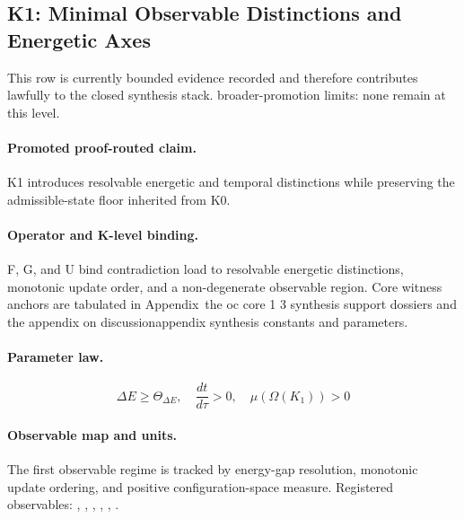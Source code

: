 \subsection{K1: Minimal Observable Distinctions and Energetic Axes}
\label{sec:oc-core-1-3-synthesis-k1}
This row is currently bounded evidence recorded and therefore contributes lawfully to the closed synthesis stack.
broader-promotion limits: none remain at this level.

\paragraph{Promoted proof-routed claim.}
K1 introduces resolvable energetic and temporal distinctions while preserving the admissible-state floor inherited from K0.

\paragraph{Operator and K-level binding.}
F, G, and U bind contradiction load to resolvable energetic distinctions, monotonic update order, and a non-degenerate observable region.
Core witness anchors are tabulated in Appendix~the oc core 1 3 synthesis support dossiers and the appendix on discussionappendix synthesis constants and parameters.

\paragraph{Parameter law.}
\[
\Delta E \geq \Theta_{\Delta E},\quad \frac{dt}{d\tau} > 0,\quad \mu(\Omega(K_1)) > 0
\]

\paragraph{Observable map and units.}
The first observable regime is tracked by energy-gap resolution, monotonic update ordering, and positive configuration-space measure.
Registered observables: , \allowbreak {}, \allowbreak {}, \allowbreak {}, \allowbreak {}, \allowbreak {}.


